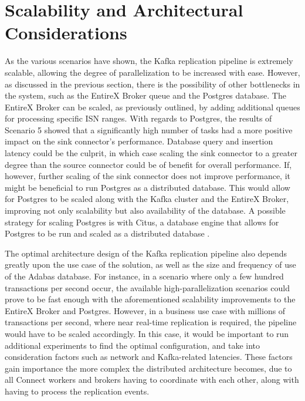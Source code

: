 \section{Scalability and Architectural Considerations}
As the various scenarios have shown, the Kafka replication pipeline is extremely scalable, allowing the degree of parallelization to be increased with ease. However, as discussed in the previous section, there is the possibility of other bottlenecks in the system, such as the EntireX Broker queue and the Postgres database. The EntireX Broker can be scaled, as previously outlined, by adding additional queues for processing specific \ac{ISN} ranges. With regards to Postgres, the results of Scenario 5 showed that a significantly high number of tasks had a more positive impact on the sink connector's performance. Database query and insertion latency could be the culprit, in which case scaling the sink connector to a greater degree than the source connector could be of benefit for overall performance. If, however, further scaling of the sink connector does not improve performance, it might be beneficial to run Postgres as a distributed database. This would allow for Postgres to be scaled along with the Kafka cluster and the EntireX Broker, improving not only scalability but also availability of the database. A possible strategy for scaling Postgres is with Citus, a database engine that allows for Postgres to be run and scaled as a distributed database \cite{cubukcu2021citus}.

The optimal architecture design of the Kafka replication pipeline also depends greatly upon the use case of the solution, as well as the size and frequency of use of the Adabas database. For instance, in a scenario where only a few hundred transactions per second occur, the available high-parallelization scenarios could prove to be fast enough with the aforementioned scalability improvements to the EntireX Broker and Postgres. However, in a business use case with millions of transactions per second, where near real-time replication is required, the pipeline would have to be scaled accordingly. In this case, it would be important to run additional experiments to find the optimal configuration, and take into consideration factors such as network and Kafka-related latencies. These factors gain importance the more complex the distributed architecture becomes, due to all Connect workers and brokers having to coordinate with each other, along with having to process the replication events.


